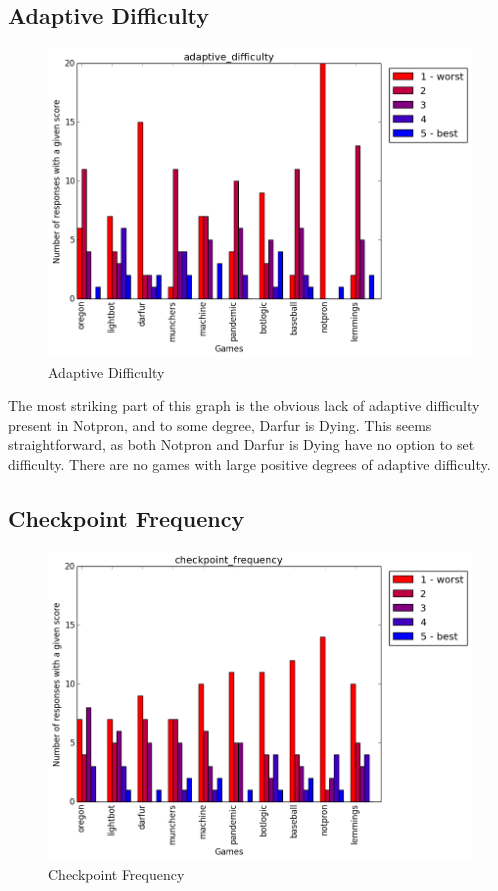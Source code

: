 			\subsection{Adaptive Difficulty}
				\begin{figure}[] 
				\centering 
				\includegraphics[width=\textwidth, height=.4\textheight, keepaspectratio=true]{adaptive_difficulty_scores.png} 
				\caption{Adaptive Difficulty}
				\end{figure}

				The most striking part of this graph is the obvious lack of adaptive difficulty present in Notpron, and to some degree, Darfur is Dying. This seems straightforward, as both Notpron and Darfur is Dying have no option to set difficulty. There are no games with large positive degrees of adaptive difficulty.

			\subsection{Checkpoint Frequency}
				\begin{figure}[] 
				\centering 
				\includegraphics[width=\textwidth, height=.4\textheight, keepaspectratio=true]{checkpoint_frequency_scores.png} 
				\caption{Checkpoint Frequency}
				\end{figure}

